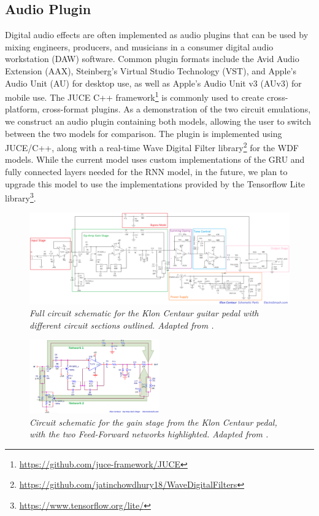 \documentclass[twoside,a4paper]{article}
\begin{document}
\subsection{Audio Plugin}
Digital audio effects are often implemented as audio plugins that
can be used by mixing engineers, producers, and musicians in a
consumer digital audio workstation (DAW) software. Common plugin
formats include the Avid Audio Extension (AAX), Steinberg's Virtual
Studio Technology (VST), and Apple's Audio Unit (AU) for desktop use,
as well as Apple's Audio Unit v3 (AUv3) for mobile use. The JUCE C++
framework\footnote{\url{https://github.com/juce-framework/JUCE}} is
commonly used to create cross-platform, cross-format plugins.
\newline\newline
As a demonstration of the two circuit emulations, we construct an audio
plugin containing both models, allowing the user to switch
between the two models for comparison. The plugin is implemented using
JUCE/C++, along with a real-time Wave Digital Filter
library\footnote{\url{https://github.com/jatinchowdhury18/WaveDigitalFilters}}
for the WDF models. While the current model uses custom implementations
of the GRU and fully connected layers needed for the RNN model, in the
future, we plan to upgrade this model to use the implementations provided
by the Tensorflow Lite library\footnote{\url{https://www.tensorflow.org/lite/}}.
%
\begin{figure}
    \centering
    \includegraphics[width=1.0\textwidth]{FullCircuit.png}
    \caption{\label{fig:fullcircuit} {\it Full circuit schematic
    for the Klon Centaur guitar pedal with different circuit
    sections outlined. Adapted from \cite{electrosmash}.}}
\end{figure}
%
\begin{figure}
    \centering
    \includegraphics[width=0.5\textwidth]{GainStageCircuit.png}
    \caption{\label{fig:gaincircuit} {\it Circuit schematic for the
    gain stage from the Klon Centaur pedal, with the two Feed-Forward
    networks highlighted. Adapted from \cite{electrosmash}.}}
\end{figure}
\end{document}
